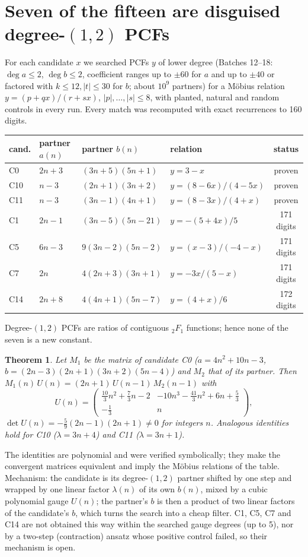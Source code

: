\documentclass[11pt]{article}
\newtheorem{theorem}{Theorem}
\begin{document}
\section{Seven of the fifteen are disguised \texorpdfstring{degree-$(1,2)$}{degree-(1,2)} PCFs}
For each candidate $x$ we searched PCFs $y$ of lower degree (Batches 12--18: $\deg a\le2$, $\deg b\le2$, coefficient ranges up to
$\pm60$ for $a$ and up to $\pm40$ or factored with $k\le12,|t|\le30$ for $b$; about $10^9$ partners) for a M\"obius relation
$y=(p+qx)/(r+sx)$, $|p|,\dots,|s|\le8$, with planted, natural and random controls in every run. Every match was recomputed with
exact recurrences to 160 digits.
\begin{center}{\small\begin{tabular}{llllc}\toprule
cand. & partner $a(n)$ & partner $b(n)$ & relation & status\\\midrule
C0 & $2n+3$ & $(3n+5)(5n+1)$ & $y=3-x$ & proven\\
C10 & $n-3$ & $(2n+1)(3n+2)$ & $y=(8-6x)/(4-5x)$ & proven\\
C11 & $n-3$ & $(3n-1)(4n+1)$ & $y=(8-3x)/(4+x)$ & proven\\
C1 & $2n-1$ & $(3n-5)(5n-21)$ & $y=-(5+4x)/5$ & 171 digits\\
C5 & $6n-3$ & $9(3n-2)(5n-2)$ & $y=(x-3)/(-4-x)$ & 171 digits\\
C7 & $2n$ & $4(2n+3)(3n+1)$ & $y=-3x/(5-x)$ & 171 digits\\
C14 & $2n+8$ & $4(4n+1)(5n-7)$ & $y=(4+x)/6$ & 172 digits\\\bottomrule
\end{tabular}}\end{center}
Degree-$(1,2)$ PCFs are ratios of contiguous ${}_2F_1$ functions; hence none of the seven is a new constant.
\begin{theorem}
Let $M_1$ be the matrix of candidate C0 ($a=4n^2+10n-3$, $b=(2n-3)(2n+1)(3n+2)(5n-4)$) and $M_2$ that of its partner. Then
$M_1(n)\,U(n)=(2n+1)\,U(n-1)\,M_2(n-1)$ with
\[U(n)=\begin{pmatrix}\frac{10}{3}n^2+\frac73n-2 & -10n^3-\frac{41}{3}n^2+6n+\frac53\\[2pt] -\frac13 & n\end{pmatrix},\]
$\det U(n)=-\frac59(2n-1)(2n+1)\neq0$ for integers $n$. Analogous identities hold for C10 ($\lambda=3n+4$) and C11 ($\lambda=3n+1$).
\end{theorem}
The identities are polynomial and were verified symbolically; they make the convergent matrices equivalent and imply the M\"obius
relations of the table. Mechanism: the candidate is its degree-$(1,2)$ partner shifted by one step and wrapped by one linear factor
$\lambda(n)$ of its own $b(n)$, mixed by a cubic polynomial gauge $U(n)$; the partner's $b$ is then a product of two linear factors
of the candidate's $b$, which turns the search into a cheap filter. C1, C5, C7 and C14 are not obtained this way within the searched
gauge degrees (up to 5), nor by a two-step (contraction) ansatz whose positive control failed, so their mechanism is open.
\end{document}
